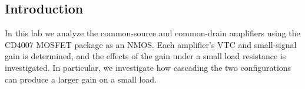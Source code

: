 \subsection{Introduction}
In this lab we analyze the common-source and common-drain amplifiers using the CD4007 MOSFET package as an NMOS.
Each amplifier's VTC and small-signal gain is determined, and the effects of the gain under a small load resistance is investigated.
In particular, we investigate how cascading the two configurations can produce a larger gain on a small load.
